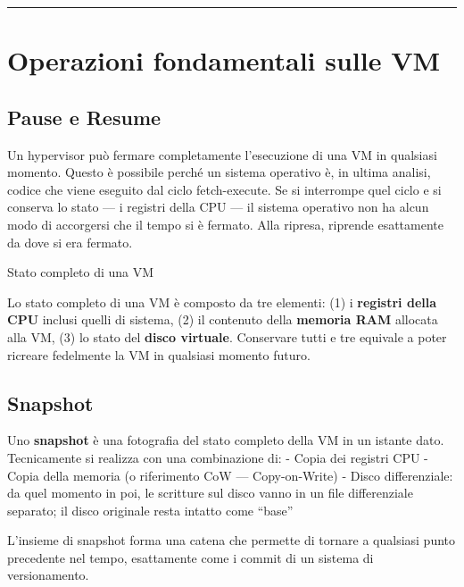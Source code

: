 \documentclass[
  italian,
  openany]{book}
\begin{document}
\begin{center}\rule{0.5\linewidth}{0.5pt}\end{center}

\section{Operazioni fondamentali sulle
VM}\label{operazioni-fondamentali-sulle-vm}

\subsection{Pause e Resume}\label{pause-e-resume}

Un hypervisor può fermare completamente l'esecuzione di una VM in
qualsiasi momento. Questo è possibile perché un sistema operativo è, in
ultima analisi, codice che viene eseguito dal ciclo fetch-execute. Se si
interrompe quel ciclo e si conserva lo stato --- i registri della CPU
--- il sistema operativo non ha alcun modo di accorgersi che il tempo si
è fermato. Alla ripresa, riprende esattamente da dove si era fermato.

\begin{calloutdefinition}{Stato completo di una VM}

Lo stato completo di una VM è composto da tre elementi: (1) i
\textbf{registri della CPU} inclusi quelli di sistema, (2) il contenuto
della \textbf{memoria RAM} allocata alla VM, (3) lo stato del
\textbf{disco virtuale}. Conservare tutti e tre equivale a poter
ricreare fedelmente la VM in qualsiasi momento futuro.

\end{calloutdefinition}

\subsection{Snapshot}\label{snapshot-1}

Uno \textbf{snapshot} è una fotografia del stato completo della VM in un
istante dato. Tecnicamente si realizza con una combinazione di: - Copia
dei registri CPU - Copia della memoria (o riferimento CoW ---
Copy-on-Write) - Disco differenziale: da quel momento in poi, le
scritture sul disco vanno in un file differenziale separato; il disco
originale resta intatto come ``base''

L'insieme di snapshot forma una catena che permette di tornare a
qualsiasi punto precedente nel tempo, esattamente come i commit di un
sistema di versionamento.
\end{document}
